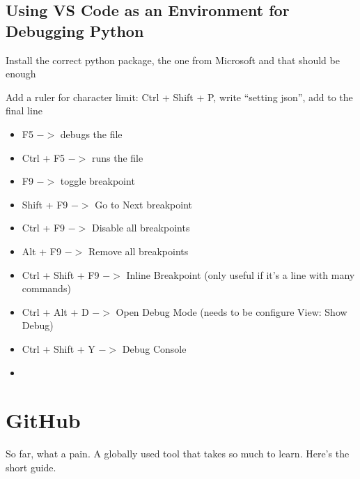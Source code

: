 \subsection{Using VS Code as an Environment for Debugging Python}
Install the correct python package, the one from Microsoft and that should be enough

Add a ruler for character limit: Ctrl + Shift + P, write ``setting json'', add to the final line 

\begin{itemize}
    \item F5 $->$ debugs the file
    \item Ctrl + F5 $->$ runs the file
    \item F9 $->$ toggle breakpoint
    \item Shift + F9 $->$ Go to Next breakpoint
    \item Ctrl + F9 $->$ Disable all breakpoints
    \item Alt + F9 $->$ Remove all breakpoints
    \item Ctrl + Shift + F9 $->$ Inline Breakpoint (only useful if it's a line with many commands)
    \item Ctrl + Alt + D $->$ Open Debug Mode (needs to be configure View: Show Debug)
    \item Ctrl + Shift + Y $->$ Debug Console
    \item {}
\end{itemize}























\section{GitHub}
\par So far, what a pain. A globally used tool that takes so much to learn. Here's the short guide.

\vspace{.5cm}

